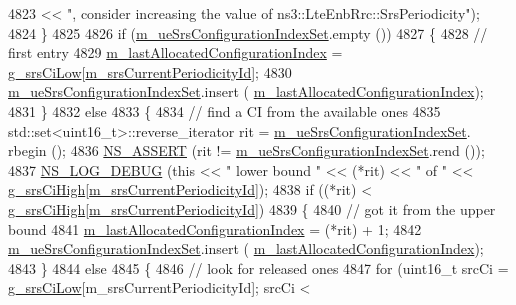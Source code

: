 \begin{DoxyCode}
4823                                        << \textcolor{stringliteral}{", consider increasing the value of
       ns3::LteEnbRrc::SrsPeriodicity"});
4824     \}
4825 
4826   \textcolor{keywordflow}{if} (\hyperlink{classns3_1_1LteEnbRrc_a1807b21ca2e25c55dcbea00ca8657aaa}{m\_ueSrsConfigurationIndexSet}.empty ())
4827     \{
4828       \textcolor{comment}{// first entry}
4829       \hyperlink{classns3_1_1LteEnbRrc_a9454a84fa173baf091a7ca00d0b85716}{m\_lastAllocatedConfigurationIndex} = 
      \hyperlink{namespacens3_a97bc3bd90b7048826869728581199a13}{g\_srsCiLow}[\hyperlink{classns3_1_1LteEnbRrc_abf0c77f8f27fff5a4e00608a6c822a8b}{m\_srsCurrentPeriodicityId}];
4830       \hyperlink{classns3_1_1LteEnbRrc_a1807b21ca2e25c55dcbea00ca8657aaa}{m\_ueSrsConfigurationIndexSet}.insert (
      \hyperlink{classns3_1_1LteEnbRrc_a9454a84fa173baf091a7ca00d0b85716}{m\_lastAllocatedConfigurationIndex});
4831     \}
4832   \textcolor{keywordflow}{else}
4833     \{
4834       \textcolor{comment}{// find a CI from the available ones}
4835       std::set<uint16\_t>::reverse\_iterator rit = \hyperlink{classns3_1_1LteEnbRrc_a1807b21ca2e25c55dcbea00ca8657aaa}{m\_ueSrsConfigurationIndexSet}.
      rbegin ();
4836       \hyperlink{assert_8h_a6dccdb0de9b252f60088ce281c49d052}{NS\_ASSERT} (rit != \hyperlink{classns3_1_1LteEnbRrc_a1807b21ca2e25c55dcbea00ca8657aaa}{m\_ueSrsConfigurationIndexSet}.rend ());
4837       \hyperlink{group__logging_ga413f1886406d49f59a6a0a89b77b4d0a}{NS\_LOG\_DEBUG} (\textcolor{keyword}{this} << \textcolor{stringliteral}{" lower bound "} << (*rit) << \textcolor{stringliteral}{" of "} << 
      \hyperlink{namespacens3_a9be5b6d95f5014b227f14aa1205959be}{g\_srsCiHigh}[\hyperlink{classns3_1_1LteEnbRrc_abf0c77f8f27fff5a4e00608a6c822a8b}{m\_srsCurrentPeriodicityId}]);
4838       \textcolor{keywordflow}{if} ((*rit) < \hyperlink{namespacens3_a9be5b6d95f5014b227f14aa1205959be}{g\_srsCiHigh}[\hyperlink{classns3_1_1LteEnbRrc_abf0c77f8f27fff5a4e00608a6c822a8b}{m\_srsCurrentPeriodicityId}])
4839         \{
4840           \textcolor{comment}{// got it from the upper bound}
4841           \hyperlink{classns3_1_1LteEnbRrc_a9454a84fa173baf091a7ca00d0b85716}{m\_lastAllocatedConfigurationIndex} = (*rit) + 1;
4842           \hyperlink{classns3_1_1LteEnbRrc_a1807b21ca2e25c55dcbea00ca8657aaa}{m\_ueSrsConfigurationIndexSet}.insert (
      \hyperlink{classns3_1_1LteEnbRrc_a9454a84fa173baf091a7ca00d0b85716}{m\_lastAllocatedConfigurationIndex});
4843         \}
4844       \textcolor{keywordflow}{else}
4845         \{
4846           \textcolor{comment}{// look for released ones}
4847           \textcolor{keywordflow}{for} (uint16\_t srcCi = \hyperlink{namespacens3_a97bc3bd90b7048826869728581199a13}{g\_srsCiLow}[m\_srsCurrentPeriodicityId]; srcCi < 

\end{DoxyCode}
